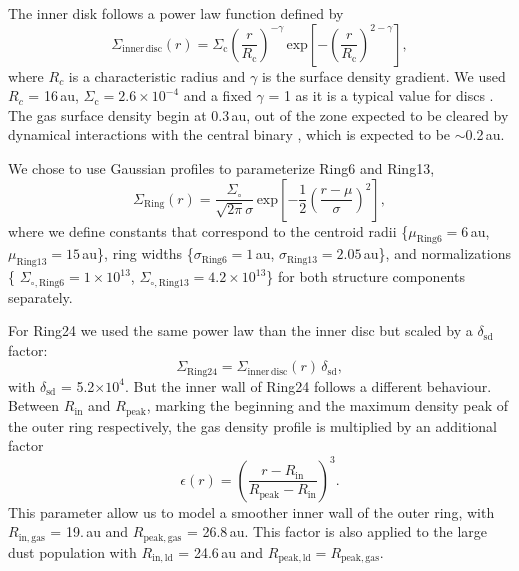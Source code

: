 \documentclass[letters,usenatbib,times]{mnras}
\begin{document}
The inner disk follows a power law function defined by
\begin{equation}
  \Sigma_{\mathrm{inner\,disc}}(r) =\Sigma_\mathrm{c} \left(\frac{r}{R_\mathrm{c}}\right)^{-\gamma}  \, \mathrm{exp}\left[-\left(\frac{r}{R_\mathrm{c}}\right)^{2-\gamma}\right],
\end{equation}
where $R_c$ is a characteristic radius and $\gamma$ is the surface density gradient. We used $R_c$ = 16\,au, $\Sigma_\mathrm{c} =2.6\times10^{-4}$ and a fixed $\gamma$ = 1 as it is a typical value for discs \citep{Andrews_2009,Andrews_2010}. The gas surface density begin at 0.3\,au, out of the zone expected to be cleared by dynamical interactions with the central binary \citep{Art_Lu}, which is expected to be $\sim$0.2\,au.

We chose to use Gaussian profiles to parameterize Ring6 and Ring13,
\begin{equation}
  \Sigma_{\mathrm{Ring}}(r) = \frac{\Sigma_\circ}{\sqrt{2 \pi} \sigma}
  \, \mathrm{exp}\left[-\frac{1}{2}\left(\frac{r-\mu}{\sigma}\right)^{2}\right],
\end{equation}
where we define constants that correspond to the centroid radii \{$\mu_{\mathrm{Ring6}}=6$\,au, $\mu_{\mathrm{Ring13}}=15$\,au\}, ring widths \{$\sigma_{\mathrm{Ring6}}=1$\,au, $\sigma_{\mathrm{Ring13}}=2.05$\,au\}, and normalizations \{ $\Sigma_{\circ,\mathrm{Ring6}}=1\times10^{13}$, $\Sigma_{\circ,\mathrm{Ring13}}=4.2\times10^{13}$\} for both structure components separately.

For Ring24 we used the same power law than the inner disc but scaled by a $\delta_{\mathrm{sd}}$ factor:
\begin{equation}
  \Sigma_{\mathrm{Ring24}} = \Sigma_{\mathrm{inner\,disc}}(r)\, \delta_{\mathrm{sd}},
\end{equation}
with $\delta_{\mathrm{sd}}$ = 5.2$\times 10^4$. But the inner wall of Ring24 follows a different behaviour. Between $R_\mathrm{in}$ and $R_\mathrm{peak}$, marking the beginning and the maximum density peak of the outer ring respectively, the gas density profile is multiplied by an additional factor
\begin{equation}
    \epsilon(r) = \left(\frac{ r - R_\mathrm{in}}{R_\mathrm{peak} - R_\mathrm{in}}\right)^3.
\end{equation}
This parameter allow us to model a smoother inner wall of the outer ring, with $R_\mathrm{in,gas}$ = 19.\,au and $R_\mathrm{peak,gas}$ = 26.8\,au. This factor is also applied to the large dust population with $R_\mathrm{in,ld}$ = 24.6\,au and $R_\mathrm{peak,ld} = R_\mathrm{peak,gas}$. 
\end{document}
